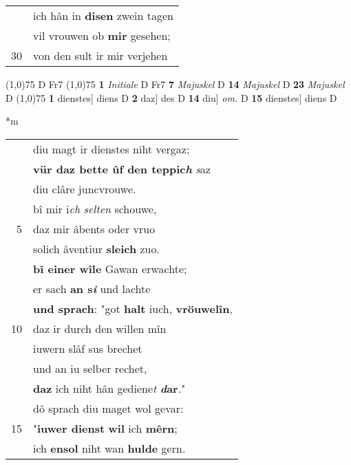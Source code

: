 \documentclass[8pt,a4paper,notitlepage]{article}
\begin{document}
\begin{table}[ht]
\begin{minipage}[t]{0.5\linewidth}
\begin{tabular}{rl}
 & ich hân in \textbf{disen} zwein tagen\\ 
 & vil vrouwen ob \textbf{mir} gesehen;\\ 
30 & von den sult ir mir verjehen\\ 
\end{tabular}
\scriptsize
\line(1,0){75} \newline
D Fr7 \newline
\line(1,0){75} \newline
\textbf{1} \textit{Initiale} D Fr7  \textbf{7} \textit{Majuskel} D  \textbf{14} \textit{Majuskel} D  \textbf{23} \textit{Majuskel} D  \newline
\line(1,0){75} \newline
\textbf{1} dienstes] diens D \textbf{2} daz] des D \textbf{14} diu] \textit{om.} D \textbf{15} dienstes] diens D \newline
\end{minipage}
\hspace{0.5cm}
\begin{minipage}[t]{0.5\linewidth}
\small
\begin{center}*m
\end{center}
\begin{tabular}{rl}
 & diu magt ir dienstes niht vergaz;\\ 
 & \textbf{vür daz bette ûf den teppic\textit{h}} \textit{s}az\\ 
 & diu clâre juncvrouwe.\\ 
 & bî mir i\textit{ch} \textit{selten} schouwe,\\ 
5 & daz mir âbents oder vruo\\ 
 & solich âventiur \textbf{sleich} zuo.\\ 
 & \textbf{bî einer wîle} Gawan erwachte;\\ 
 & er sach \textbf{an s\textit{i}} und lachte\\ 
 & \textbf{und sprach}: "got \textbf{halt} iuch, \textbf{vröuwelîn},\\ 
10 & daz ir durch den willen mîn\\ 
 & iuwern slâf sus brechet\\ 
 & und an iu selber rechet,\\ 
 & \textbf{daz} ich niht hân gediene\textit{t} \textbf{\textit{d}ar}."\\ 
 & dô sprach diu maget wol gevar:\\ 
15 & "\textbf{iuwer dienst} \textbf{wil} ich \textbf{mêrn};\\ 
 & ich \textbf{ensol} niht wan \textbf{hulde} gern.\\ 

\end{tabular}
\end{minipage}
\end{table}
\end{document}
